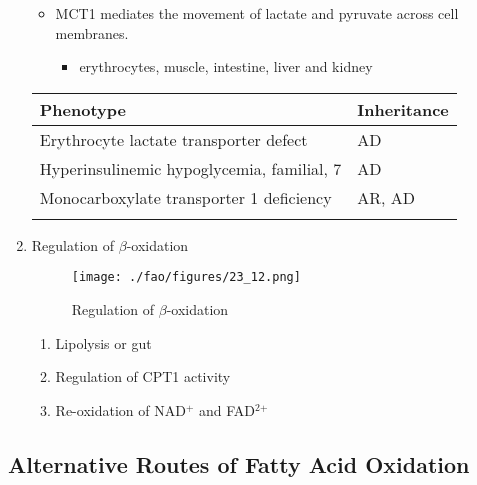 \documentclass{scrartcl}
\begin{document}
\begin{enumerate}
\begin{itemize}
\item MCT1 mediates the movement of lactate and pyruvate across cell
membranes.
\begin{itemize}
\item erythrocytes, muscle, intestine, liver and kidney
\end{itemize}
\end{itemize}

\begin{center}
\begin{tabular}{ll}
Phenotype & Inheritance\\
\hline
Erythrocyte lactate transporter defect & AD\\
Hyperinsulinemic hypoglycemia, familial, 7\footnotemark & AD\\
Monocarboxylate transporter 1 deficiency & AR, AD\\
 & \\
\end{tabular}
\end{center}


\item Regulation of \(\beta\)-oxidation
\label{sec:orgf6d25c5}
\begin{figure}[htbp]
\centering
\texttt{[image: ./fao/figures/23\_12.png]}
\caption{\label{fig:org1907313}
Regulation of \(\beta\)-oxidation}
\end{figure}

\begin{enumerate}
\item Lipolysis or gut
\item Regulation of CPT1 activity
\item Re-oxidation of NAD\(^{\text{+}}\) and FAD\(^{\text{2+}}\)
\end{enumerate}
\end{enumerate}

\subsection{Alternative Routes of Fatty Acid Oxidation}
\label{sec:org2dbfe1a}
\end{document}
